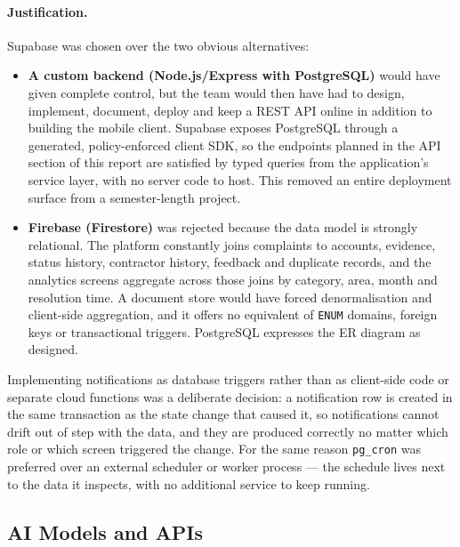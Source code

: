 \documentclass[11pt,a4paper]{article}
\newcommand{\code}[1]{\texttt{\small #1}}
\begin{document}
\paragraph{Justification.} Supabase was chosen over the two obvious
alternatives:

\begin{itemize}[leftmargin=1.4em,itemsep=0.35em]
  \item \textbf{A custom backend (Node.js/Express with PostgreSQL)} would have
        given complete control, but the team would then have had to design,
        implement, document, deploy and keep a REST API online in addition to
        building the mobile client. Supabase exposes PostgreSQL through a
        generated, policy-enforced client SDK, so the endpoints planned in the
        API section of this report are satisfied by typed queries from the
        application's service layer, with no server code to host. This removed an
        entire deployment surface from a semester-length project.
  \item \textbf{Firebase (Firestore)} was rejected because the data model is
        strongly relational. The platform constantly joins complaints to
        accounts, evidence, status history, contractor history, feedback and
        duplicate records, and the analytics screens aggregate across those joins
        by category, area, month and resolution time. A document store would have
        forced denormalisation and client-side aggregation, and it offers no
        equivalent of \code{ENUM} domains, foreign keys or transactional
        triggers. PostgreSQL expresses the ER diagram as designed.
\end{itemize}

Implementing notifications as database triggers rather than as client-side code
or separate cloud functions was a deliberate decision: a notification row is
created in the same transaction as the state change that caused it, so
notifications cannot drift out of step with the data, and they are produced
correctly no matter which role or which screen triggered the change. For the same
reason \code{pg\_cron} was preferred over an external scheduler or worker process
--- the schedule lives next to the data it inspects, with no additional service
to keep running.

\subsection{AI Models and APIs}
\end{document}
